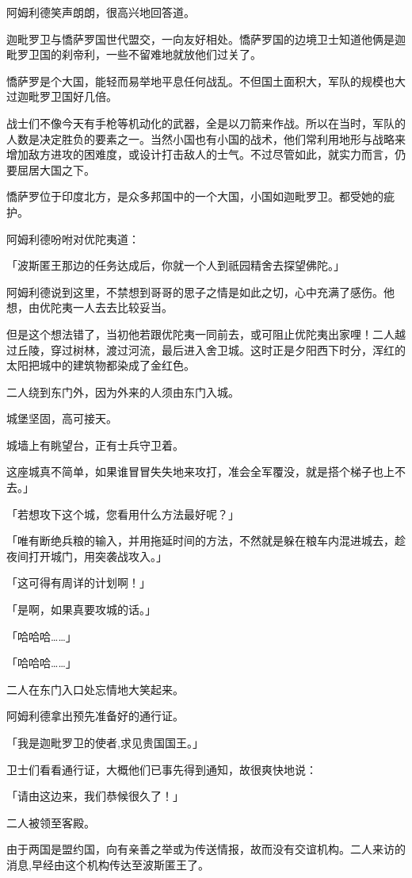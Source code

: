 \documentclass[twoside,openany]{book}
\begin{document}
阿姆利德笑声朗朗，很高兴地回答道。

迦毗罗卫与憍萨罗国世代盟交，一向友好相处。憍萨罗国的边境卫士知道他俩是迦毗罗卫国的刹帝利，一些不留难地就放他们过关了。

憍萨罗是个大国，能轻而易举地平息任何战乱。不但国土面积大，军队的规模也大过迦毗罗卫国好几倍。

战士们不像今天有手枪等机动化的武器，全是以刀箭来作战。所以在当时，军队的人数是决定胜负的要素之一。当然小国也有小国的战术，他们常利用地形与战略来增加敌方进攻的困难度，或设计打击敌人的士气。不过尽管如此，就实力而言，仍要屈居大国之下。

憍萨罗位于印度北方，是众多邦国中的一个大国，小国如迦毗罗卫。都受她的疵护。

阿姆利德吩咐对优陀夷道：

「波斯匿王那边的任务达成后，你就一个人到祇园精舍去探望佛陀。」

阿姆利德说到这里，不禁想到哥哥的思子之情是如此之切，心中充满了感伤。他想，由优陀夷一人去去比较妥当。

但是这个想法错了，当初他若跟优陀夷一同前去，或可阻止优陀夷出家哩！二人越过丘陵，穿过树林，渡过河流，最后进入舍卫城。这时正是夕阳西下时分，浑红的太阳把城中的建筑物都染成了金红色。

二人绕到东门外，因为外来的人须由东门入城。

城堡坚固，高可接天。

城墙上有眺望台，正有士兵守卫着。

这座城真不简单，如果谁冒冒失失地来攻打，准会全军覆没，就是搭个梯子也上不去。」

「若想攻下这个城，您看用什么方法最好呢？」

「唯有断绝兵粮的输入，并用拖延时间的方法，不然就是躲在粮车内混进城去，趁夜间打开城门，用突袭战攻入。」

「这可得有周详的计划啊！」

「是啊，如果真要攻城的话。」

「哈哈哈……」

「哈哈哈……」

二人在东门入口处忘情地大笑起来。

阿姆利德拿出预先准备好的通行证。

「我是迦毗罗卫的使者,求见贵国国王。」

卫士们看看通行证，大概他们已事先得到通知，故很爽快地说：

「请由这边来，我们恭候很久了！」

二人被领至客殿。

由于两国是盟约国，向有亲善之举或为传送情报，故而没有交谊机构。二人来访的消息,早经由这个机构传达至波斯匿王了。
\end{document}
